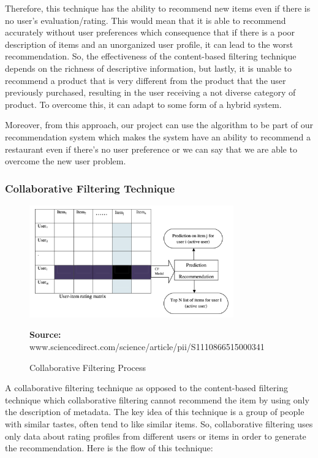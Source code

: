 \documentclass[12pt,oneside,openright,a4paper]{cpe-english-project}
\newcommand*{\captionsource}[2]{%
  \caption[{#1}]{#1}\vspace{-8pt}
  \textbf{Source:} #2}
\begin{document}
Therefore, this technique has the ability to recommend new items even if there is no user’s evaluation/rating. This would mean that it is able to recommend accurately without user preferences which consequence that if there is a poor description of items and an unorganized user profile, it can lead to the worst recommendation. So, the effectiveness of the content-based filtering technique depends on the richness of descriptive information, but lastly, it is unable to recommend a product that is very different from the product that the user previously purchased, resulting in the user receiving a not diverse category of product. To overcome this, it can adapt to some form of a hybrid system.

Moreover, from this approach, our project can use the algorithm to be part of our recommendation system which makes the system have an ability to recommend a restaurant even if there’s no user preference or we can say that we are able to overcome the new user problem.


\subsubsection{Collaborative Filtering Technique}

\begin{figure}[H]\centering
\includegraphics[width=250pt]{./images/2cfprocess.png}
\captionsource{Collaborative Filtering Process}{www.sciencedirect.com/science/article/pii/S1110866515000341}
\label{fig:2cfprocess}
\end{figure}\vspace{-24pt}
\vspace{1em}

A collaborative filtering technique as opposed to the content-based filtering technique which collaborative filtering cannot recommend the item by using only the description of metadata. The key idea of this technique is a group of people with similar tastes, often tend to like similar items. So, collaborative filtering uses only data about rating profiles from different users or items in order to generate the recommendation. Here is the flow of this technique:
\end{document}
